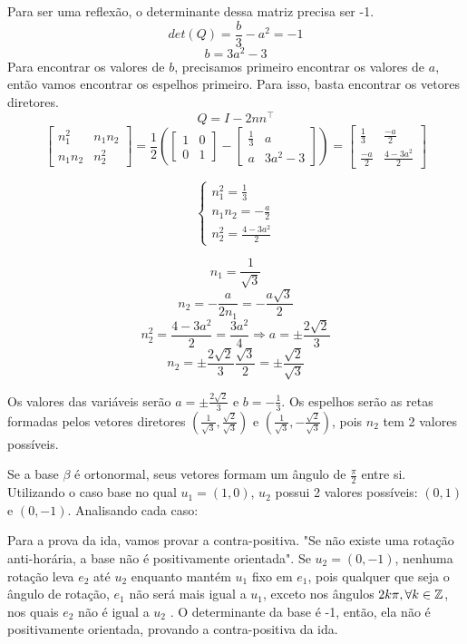\documentclass{homework}
\begin{document}
\exercise
Para ser uma reflexão, o determinante dessa matriz precisa ser -1.
\[det(Q) = \frac{b}{3} - a^2 = -1\]
\[b = 3a^2 - 3\]
Para encontrar os valores de $b$, precisamos primeiro encontrar os valores de $a$, então vamos encontrar os espelhos primeiro. Para isso, basta encontrar os vetores diretores.
\[Q = I - 2nn^\top\]
\[\begin{bmatrix}
n_1^2 & n_1n_2\\
n_1n_2 & n_2^2
\end{bmatrix} = \frac{1}{2}
\left(\begin{bmatrix}
1 & 0\\
0 & 1
\end{bmatrix} - 
\begin{bmatrix}
\frac{1}{3} & a\\
a & 3a^2 - 3
\end{bmatrix}\right) =
\begin{bmatrix}
\frac{1}{3} & \frac{-a}{2}\\
\frac{-a}{2} & \frac{4 - 3a^2}{2}
\end{bmatrix}\]
\begin{center}
\[
\begin{cases}
n_1^2 = \frac{1}{3}\\
n_1 n_2 = -\frac{a}{2}\\
n_2^2 = \frac{4-3a^2}{2}
\end{cases}
\]
\end{center}
\[n_1 = \frac{1}{\sqrt{3}}\]
\[n_2 = -\frac{a}{2n_1} = -\frac{a\sqrt{3}}{2}\]
\[n_2^2 = \frac{4-3a^2}{2} = \frac{3a^2}{4} \Longrightarrow a = \pm\frac{2\sqrt{2}}{3}\]
\[n_2 = \pm\frac{2\sqrt{2}}{3}\frac{\sqrt{3}}{2} = \pm\frac{\sqrt{2}}{\sqrt{3}}\]

Os valores das variáveis serão $a = \pm\frac{2\sqrt{2}}{3}$ e $b = -\frac{1}{3}$. Os espelhos serão as retas formadas pelos vetores diretores $(\frac{1}{\sqrt{3}},\frac{\sqrt{2}}{\sqrt{3}})$ e $(\frac{1}{\sqrt{3}},-\frac{\sqrt{2}}{\sqrt{3}})$, pois $n_2$ tem 2 valores possíveis.

\exercise*
Se a base $\beta$ é ortonormal, seus vetores formam um ângulo de $\frac{\pi}{2}$ entre si. Utilizando o caso base no qual $u_1 = (1,0)$, $u_2$ possui 2 valores possíveis: $(0,1)$ e $(0,-1)$. Analisando cada caso:

Para a prova da ida, vamos provar a contra-positiva. "Se não existe uma rotação anti-horária, a base não é positivamente orientada". Se $u_2 = (0,-1)$, nenhuma rotação leva $e_2$ até $u_2$ enquanto mantém $u_1$ fixo em $e_1$, pois qualquer que seja o ângulo de rotação, $e_1$ não será mais igual a $u_1$, exceto nos ângulos $2k\pi, \forall k \in \mathbb Z$, nos quais $e_2$ não é igual a $u_2$ . O determinante da base é -1, então, ela não é positivamente orientada, provando a contra-positiva da ida. 
\end{document}
